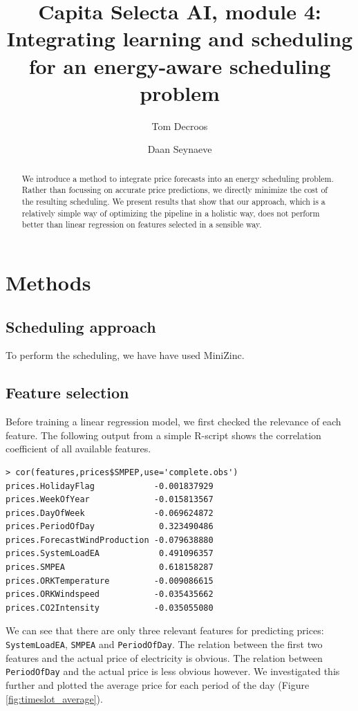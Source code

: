 \documentclass{article}
\title{Capita Selecta AI, module 4:\\ Integrating learning and scheduling for an energy-aware scheduling problem}
\author{Tom Decroos \and Daan Seynaeve}
\begin{document}
\maketitle
\begin{abstract}
	We introduce a method to integrate price forecasts into an energy scheduling problem. Rather than focussing on accurate price  predictions, we directly minimize the cost of the resulting scheduling. We present results that show that our approach, which is a relatively simple way of optimizing the pipeline in a holistic way, does not perform better than linear regression on features selected in a sensible way.
\end{abstract}
\section{Methods}
\subsection{Scheduling approach}
To perform the scheduling, we have have used MiniZinc.

\subsection{Feature selection}
Before training a linear regression model, we first checked the relevance of each feature. The following output from a simple R-script shows the correlation coefficient of all available features.
\begin{verbatim}
> cor(features,prices$SMPEP,use='complete.obs')
prices.HolidayFlag            -0.001837929
prices.WeekOfYear             -0.015813567
prices.DayOfWeek              -0.069624872
prices.PeriodOfDay             0.323490486
prices.ForecastWindProduction -0.079638880
prices.SystemLoadEA            0.491096357
prices.SMPEA                   0.618158287
prices.ORKTemperature         -0.009086615
prices.ORKWindspeed           -0.035435662
prices.CO2Intensity           -0.035055080
\end{verbatim}
We can see that there are only three relevant features for predicting prices: \verb|SystemLoadEA|, \verb|SMPEA| and \verb|PeriodOfDay|. The relation between the first two features and the actual price of electricity is obvious. The relation between \verb|PeriodOfDay| and the actual price is less obvious however. We investigated this further and plotted the average price for each period of the day (Figure \ref{fig:timeslot_average}).
\end{document}
